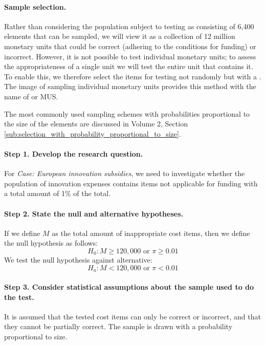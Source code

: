 \paragraph{Sample selection.} Rather than considering the population subject to testing as consisting of 6,400 elements that can be sampled, we will view it as a collection of 12 million monetary units that could be correct (adhering to the conditions for funding) or incorrect. 
However, it is not possible to test individual monetary units; to assess the appropriateness of a single unit we will test the entire unit that contains it. 
To enable this, we therefore select the items for testing not randomly but with a . 
The image of sampling individual monetary units provides this method with the name of  or MUS.

The most commonly used sampling schemes with probabilities pro\-por\-tion\-al to the size of the elements are discussed in Volume 2, Section \ref{sub:selection_with_probability_proportional_to_size}.

\paragraph{Step 1. Develop the research question.} For \emph{Case: European innovation subsidies}, we need to investigate whether the population of innovation expenses contains items not applicable for funding with a total amount of 1\% of the total.

\paragraph{Step 2. State the null and alternative hypotheses.} If we define $M$ as the total amount of inappropriate cost items, then we define the null hypothesis as follows:
\begin{equation*}
H_0 : M \geq 120,000 \text{ or } \pi \geq 0.01
\end{equation*}
We test the null hypothesis against alternative:
\begin{equation*}
H_a : M < 120,000 \text{ or } \pi < 0.01
\end{equation*}

\paragraph{Step 3. Consider statistical assumptions about the sample used to do the test.} It is assumed that the tested cost items can only be correct or incorrect, and that they cannot be partially correct. The sample is drawn with a probability proportional to size. 

